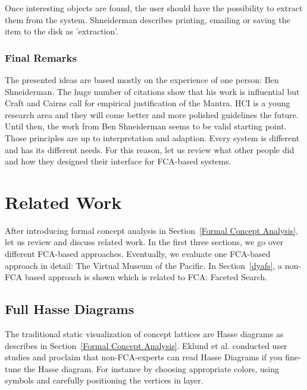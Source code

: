 \documentclass[11pt]{report}
\begin{document}
Once interesting objects are found, the user should have the possibility to extract them from the system. Shneiderman describes printing, emailing or saving the item to the disk as 'extraction'.

\subsection{Final Remarks}

The presented ideas are based mostly on the experience of one person: Ben Shneiderman. The huge number of citations show that his work is influential but Craft and Cairns \cite{Craft2005} call for empirical justification of the Mantra. HCI is a young research area and they will come better and more polished guidelines the future. Until then, the work from Ben Shneiderman seems to be valid starting point. \\

Those principles are up to interpretation and adaption. Every system is different and has its different needs. For this reason, let us review what other people did and how they designed their interface for FCA-based systems.

\chapter{Related Work}
\label{Related Work}

After introducing formal concept analysis in Section~\ref{Formal Concept Analysis}, let us review and discuss related work. In the first three sections, we go over different FCA-based approaches. Eventually, we evaluate one FCA-based approach in detail: The Virtual Museum of the Pacific. In Section~\ref{dyafs}, a non-FCA based approach is shown which is related to FCA: Faceted Search. \\

\section{Full Hasse Diagrams}

The traditional static visualization of concept lattices are Hasse diagrams as describes in Section~\ref{Formal Concept Analysis}. Eklund et al. \cite{Eklund2004} conducted user studies and proclaim that non-FCA-experts can read Hasse Diagrams if you fine-tune the Hasse diagram. For instance by choosing appropriate colors, using symbols and carefully positioning the vertices in layer. \\
\end{document}
